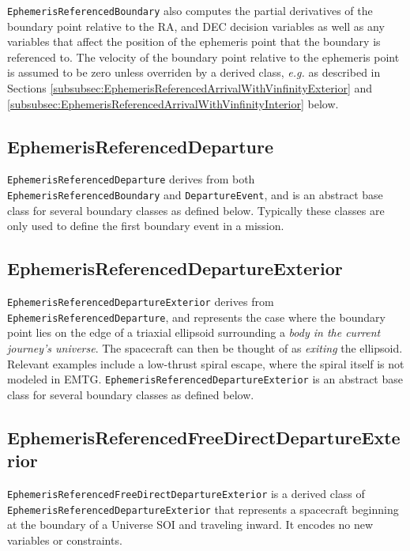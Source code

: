 \texttt{EphemerisReferencedBoundary} also computes the partial derivatives of the boundary point relative to the RA, and DEC decision variables as well as any variables that affect the position of the ephemeris point that the boundary is referenced to. The velocity of the boundary point relative to the ephemeris point is assumed to be zero unless overriden by a derived class, \textit{e.g.} as described in Sections \ref{subsubsec:EphemerisReferencedArrivalWithVinfinityExterior} and \ref{subsubsec:EphemerisReferencedArrivalWithVinfinityInterior} below.

\subsection{EphemerisReferencedDeparture}
\label{subsec:EphemerisReferencedDeparture}

\texttt{EphemerisReferencedDeparture} derives from both \texttt{EphemerisReferencedBoundary} and \texttt{DepartureEvent}, and is an abstract base class for several boundary classes as defined below. Typically these classes are only used to define the first boundary event in a mission.

\subsection{EphemerisReferencedDepartureExterior}
\label{subsubsec:EphemerisReferencedDepartureExterior}

\texttt{EphemerisReferencedDepartureExterior} derives from \texttt{EphemerisReferencedDeparture}, and represents the case where the boundary point lies on the edge of a triaxial ellipsoid surrounding a \textit{body in the current journey's universe}. The spacecraft can then be thought of as \textit{exiting} the ellipsoid. Relevant examples include a low-thrust spiral escape, where the spiral itself is not modeled in \ac{EMTG}.  \texttt{EphemerisReferencedDepartureExterior} is an abstract base class for several boundary classes as defined below.

\subsection{EphemerisReferencedFreeDirectDepartureExterior}
\label{subsec:EphemerisReferencedFreeDirectDepartureExterior}

\texttt{EphemerisReferencedFreeDirectDepartureExterior} is a derived class of \texttt{EphemerisReferencedDepartureExterior} that represents a spacecraft beginning at the boundary of a Universe \ac{SOI} and traveling inward. It encodes no new variables or constraints.

